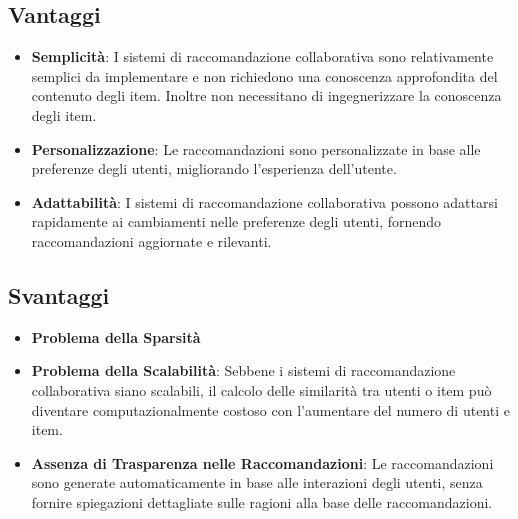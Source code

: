 \documentclass{report}
\begin{document}
	\subsection{Vantaggi}
	\begin{itemize}
		\item \textbf{Semplicità}: I sistemi di raccomandazione collaborativa sono relativamente semplici da implementare e non richiedono una conoscenza approfondita del contenuto degli item. Inoltre non necessitano di ingegnerizzare la conoscenza degli item.
		\item \textbf{Personalizzazione}: Le raccomandazioni sono personalizzate in base alle preferenze degli utenti, migliorando l'esperienza dell'utente.
		\item \textbf{Adattabilità}: I sistemi di raccomandazione collaborativa possono adattarsi rapidamente ai cambiamenti nelle preferenze degli utenti, fornendo raccomandazioni aggiornate e rilevanti.
	\end{itemize}
	\subsection{Svantaggi}
	\begin{itemize}
		\item \textbf{Problema della Sparsità}
		\item \textbf{Problema della Scalabilità}: Sebbene i sistemi di raccomandazione collaborativa siano scalabili, il calcolo delle similarità tra utenti o item può diventare computazionalmente costoso con l'aumentare del numero di utenti e item.
		\item \textbf{Assenza di Trasparenza nelle Raccomandazioni}: Le raccomandazioni sono generate automaticamente in base alle interazioni degli utenti, senza fornire spiegazioni dettagliate sulle ragioni alla base delle raccomandazioni.
	\end{itemize}
\end{document}
